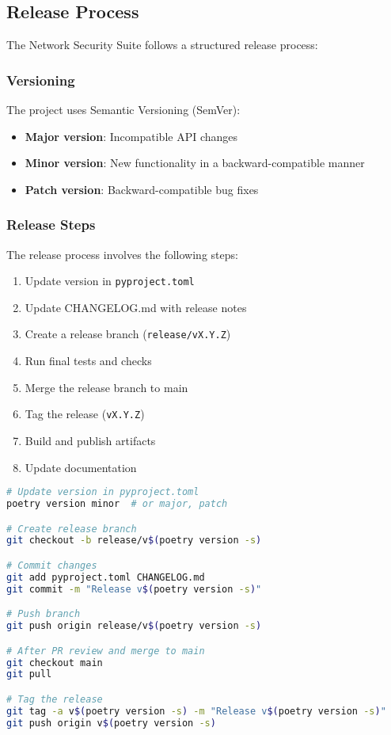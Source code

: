 \subsection{Release Process}
The Network Security Suite follows a structured release process:

\subsubsection{Versioning}
The project uses Semantic Versioning (SemVer):

\begin{itemize}
    \item \textbf{Major version}: Incompatible API changes
    \item \textbf{Minor version}: New functionality in a backward-compatible manner
    \item \textbf{Patch version}: Backward-compatible bug fixes
\end{itemize}

\subsubsection{Release Steps}
The release process involves the following steps:

\begin{enumerate}
    \item Update version in \texttt{pyproject.toml}
    \item Update CHANGELOG.md with release notes
    \item Create a release branch (\texttt{release/vX.Y.Z})
    \item Run final tests and checks
    \item Merge the release branch to main
    \item Tag the release (\texttt{vX.Y.Z})
    \item Build and publish artifacts
    \item Update documentation
\end{enumerate}

\begin{lstlisting}[language=bash, caption=Release Process]
# Update version in pyproject.toml
poetry version minor  # or major, patch

# Create release branch
git checkout -b release/v$(poetry version -s)

# Commit changes
git add pyproject.toml CHANGELOG.md
git commit -m "Release v$(poetry version -s)"

# Push branch
git push origin release/v$(poetry version -s)

# After PR review and merge to main
git checkout main
git pull

# Tag the release
git tag -a v$(poetry version -s) -m "Release v$(poetry version -s)"
git push origin v$(poetry version -s)
\end{lstlisting}

